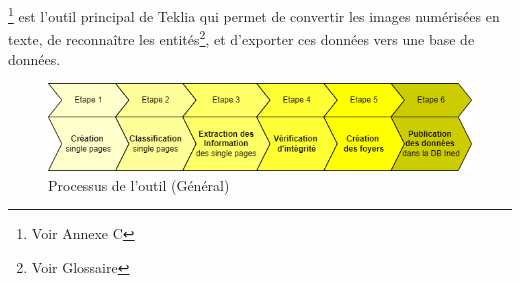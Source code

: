 \Arkindex{}\footnote{Voir Annexe C} est l'outil principal de Teklia qui permet de convertir les images numérisées en texte, de reconnaître les \gls{entités}\footnote{Voir Glossaire}, et d'exporter ces données vers une base de données.

\begin{figure}[H]
        \centering
        \includegraphics[width=0.8\linewidth]{Figures/Partie 1/Fig.1.6 - Arkindex General.png}
        \caption[Processus de l'outil \Arkindex{} (Général)]{Processus de l'outil \Arkindex{} (Général)}
        \label{fig:Fig1.6}
    \end{figure}

